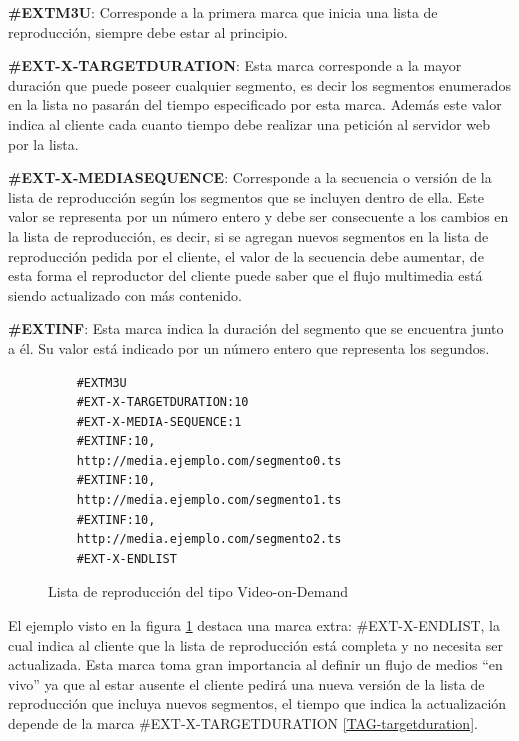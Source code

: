 \begin{prop}

\item \textbf{\#EXTM3U}: Corresponde a la primera marca que inicia una lista de reproducción, siempre debe estar al principio.

\item \textbf{\#EXT-X-TARGETDURATION}: Esta marca corresponde a la mayor duración que puede poseer cualquier segmento, es decir los segmentos enumerados en la lista no pasarán del tiempo especificado por esta marca.
Además este valor indica al cliente cada cuanto tiempo debe realizar una petición al servidor web por la lista.
\label{TAG-targetduration}

\item \label{TAG-mediasequence} \textbf{\#EXT-X-MEDIASEQUENCE}: Corresponde a la secuencia o versión de la lista de reproducción según los segmentos que se incluyen dentro de ella. Este valor se representa por un número entero y debe ser consecuente a los cambios en la lista de reproducción, es decir, si se agregan nuevos segmentos en la lista de reproducción pedida por el cliente, el valor de la secuencia debe aumentar, de esta forma el reproductor del cliente puede saber que el flujo multimedia está siendo actualizado con más contenido.


\item \label{TAG-extinfint} \textbf{\#EXTINF}: Esta marca indica la duración del segmento que se encuentra junto a él. Su valor está indicado por un número entero que representa los segundos.\\
\end{prop}

\begin{figure}[H]
	\centering
	\begin{lstlisting}
	#EXTM3U
	#EXT-X-TARGETDURATION:10
	#EXT-X-MEDIA-SEQUENCE:1
	#EXTINF:10,
	http://media.ejemplo.com/segmento0.ts
	#EXTINF:10,
	http://media.ejemplo.com/segmento1.ts
	#EXTINF:10,
	http://media.ejemplo.com/segmento2.ts
	#EXT-X-ENDLIST
	\end{lstlisting}
	\caption{Lista de reproducción del tipo Video-on-Demand}
	\label{ejemploM3U8}	
\end{figure}			

El ejemplo visto en la figura \ref{ejemploM3U8} destaca una marca extra: \#EXT-X-ENDLIST, la cual indica al cliente que la lista de reproducción está completa y no necesita ser actualizada. Esta marca toma gran importancia al definir un flujo de medios ``en vivo'' ya que al estar ausente el cliente pedirá una nueva versión de la lista de reproducción que incluya nuevos segmentos, el tiempo que indica la actualización depende de la marca \#EXT-X-TARGETDURATION \ref{TAG-targetduration}.\\

